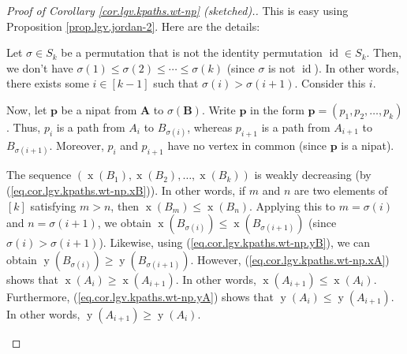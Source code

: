 \begin{proof}
[Proof of Corollary \ref{cor.lgv.kpaths.wt-np} (sketched).]This is easy using
Proposition \ref{prop.lgv.jordan-2}. Here are the details: \medskip

\begin{fineprint}
Let $\sigma\in S_{k}$ be a permutation that is not the identity permutation
$\operatorname*{id}\in S_{k}$. Then, we don't have $\sigma\left(  1\right)
\leq\sigma\left(  2\right)  \leq\cdots\leq\sigma\left(  k\right)  $ (since
$\sigma$ is not $\operatorname*{id}$). In other words, there exists some
$i\in\left[  k-1\right]  $ such that $\sigma\left(  i\right)  >\sigma\left(
i+1\right)  $. Consider this $i$.

Now, let $\mathbf{p}$ be a nipat from $\mathbf{A}$ to $\sigma\left(
\mathbf{B}\right)  $. Write $\mathbf{p}$ in the form $\mathbf{p}=\left(
p_{1},p_{2},\ldots,p_{k}\right)  $. Thus, $p_{i}$ is a path from $A_{i}$ to
$B_{\sigma\left(  i\right)  }$, whereas $p_{i+1}$ is a path from $A_{i+1}$ to
$B_{\sigma\left(  i+1\right)  }$. Moreover, $p_{i}$ and $p_{i+1}$ have no
vertex in common (since $\mathbf{p}$ is a nipat).

The sequence $\left(  \operatorname*{x}\left(  B_{1}\right)
,\operatorname*{x}\left(  B_{2}\right)  ,\ldots,\operatorname*{x}\left(
B_{k}\right)  \right)  $ is weakly decreasing (by
(\ref{eq.cor.lgv.kpaths.wt-np.xB})). In other words, if $m$ and $n$ are two
elements of $\left[  k\right]  $ satisfying $m>n$, then $\operatorname*{x}%
\left(  B_{m}\right)  \leq\operatorname*{x}\left(  B_{n}\right)  $. Applying
this to $m=\sigma\left(  i\right)  $ and $n=\sigma\left(  i+1\right)  $, we
obtain $\operatorname*{x}\left(  B_{\sigma\left(  i\right)  }\right)
\leq\operatorname*{x}\left(  B_{\sigma\left(  i+1\right)  }\right)  $ (since
$\sigma\left(  i\right)  >\sigma\left(  i+1\right)  $). Likewise, using
(\ref{eq.cor.lgv.kpaths.wt-np.yB}), we can obtain $\operatorname*{y}\left(
B_{\sigma\left(  i\right)  }\right)  \geq\operatorname*{y}\left(
B_{\sigma\left(  i+1\right)  }\right)  $. However,
(\ref{eq.cor.lgv.kpaths.wt-np.xA}) shows that $\operatorname*{x}\left(
A_{i}\right)  \geq\operatorname*{x}\left(  A_{i+1}\right)  $. In other words,
$\operatorname*{x}\left(  A_{i+1}\right)  \leq\operatorname*{x}\left(
A_{i}\right)  $. Furthermore, (\ref{eq.cor.lgv.kpaths.wt-np.yA}) shows that
$\operatorname*{y}\left(  A_{i}\right)  \leq\operatorname*{y}\left(
A_{i+1}\right)  $. In other words, $\operatorname*{y}\left(  A_{i+1}\right)
\geq\operatorname*{y}\left(  A_{i}\right)  $.


\end{fineprint}
\end{proof}
